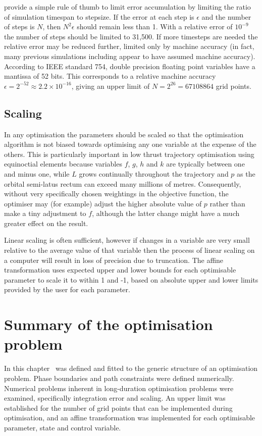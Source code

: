 \textcite{Milani1987} provide a simple rule of thumb to limit error accumulation by limiting the ratio of simulation timespan to stepsize. If the error at each step is $\epsilon$ and the number of steps is $N$, then $N^{2}\epsilon$ should remain less than 1. With a relative error of $10^{-9}$ the number of steps should be limited to 31,500. If more timesteps are needed the relative error may be reduced further, limited only by machine accuracy (in fact, many previous simulations including \citeauthor{Milani1987} appear to have assumed machine accuracy). According to IEEE standard 754, double precision floating point variables have a mantissa of 52 bits. This corresponds to a relative machine accuracy $\epsilon=2^{-52}\approx2.2\times10^{-16}$, giving an upper limit of $N=2^{26}=67108864$ grid points.

\subsection{Scaling} \label{sub:Scaling}

In any optimisation the parameters should be scaled so that the optimisation algorithm is not biased towards optimising any one variable at the expense of the others. This is particularly important in low thrust trajectory optimisation using equinoctial elements because variables $f$, $g$, $h$ and $k$ are typically between one and minus one, while $L$ grows continually throughout the trajectory and $p$ as the orbital semi-latus rectum can exceed many millions of metres. Consequently, without very specifically chosen weightings in the objective function, the optimiser may (for example) adjust the higher absolute value of $p$ rather than make a tiny adjustment to $f$, although the latter change might have a much greater effect on the result.

Linear scaling is often sufficient, however if changes in a variable are very small relative to the average value of that variable then the process of linear scaling on a computer will result in loss of precision due to truncation. The affine transformation \parencite{ASTOS_guide} uses expected upper and lower bounds for each optimisable parameter to scale it to within 1 and -1, based on absolute upper and lower limits provided by the user for each parameter.

\section{Summary of the optimisation problem} \label{sec:Optimisation-Summary}

In this chapter \BW\ was defined and fitted to the generic structure of an optimisation problem. Phase boundaries and path constraints were defined numerically. Numerical problems inherent in long-duration optimisation problems were examined, specifically integration error and scaling. An upper limit was established for the number of grid points that can be implemented during optimisation, and an affine transformation was implemented for each optimisable parameter, state and control variable. 
 
\clearpage